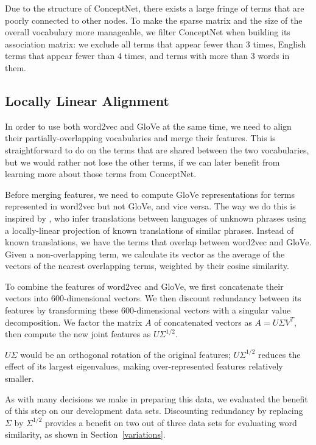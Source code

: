 \documentclass[11pt,letterpaper]{article}
\begin{document}
Due to the structure of ConceptNet, there exists a large fringe of terms that are
poorly connected to other nodes. To make the sparse matrix and the size of the
overall vocabulary more manageable, we filter ConceptNet when building its
association matrix: we exclude all terms that appear fewer than 3 times, English
terms that appear fewer than 4 times, and terms with more than 3 words in them.

\subsection{Locally Linear Alignment}
\label{locally-linear-alignment}

In order to use both word2vec and GloVe at the same time, we need to align their
partially-overlapping vocabularies and merge their features. This is
straightforward to do on the terms that are shared between the two vocabularies,
but we would rather not lose the other terms, if we can later benefit from
learning more about those terms from ConceptNet.

Before merging features, we need to compute GloVe representations for terms
represented in word2vec but not GloVe, and vice versa. The way we do this
is inspired by , who infer translations between
languages of unknown phrases using a locally-linear projection of known
translations of similar phrases. Instead of known translations, we have the
terms that overlap between word2vec and GloVe. Given a non-overlapping term,
we calculate its vector as the average of the vectors of the nearest
overlapping terms, weighted by their cosine similarity.

To combine the features of word2vec and GloVe, we first concatenate their
vectors into 600-dimensional vectors. We then discount redundancy between its
features by transforming these 600-dimensional vectors with a singular value
decomposition.  We factor the matrix $A$ of concatenated vectors as $A = U
\Sigma V^T$, then compute the new joint features as $U \Sigma^{1/2}$.

$U \Sigma$ would be an orthogonal rotation of the original features;
$U \Sigma^{1/2}$ reduces the effect of its largest eigenvalues, making
over-represented features relatively smaller.

As with many decisions we make in preparing this data, we evaluated the benefit
of this step on our development data sets.  Discounting redundancy by replacing
$\Sigma$ by $\Sigma^{1/2}$ provides a benefit on two out of three data sets for
evaluating word similarity, as shown in Section~\ref{variations}.
\end{document}
